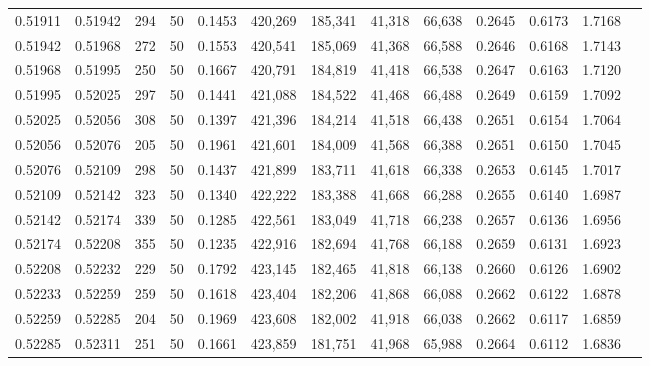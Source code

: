 \begin{tabular}{rrrrrrrrrrrrr}
0.51911 & 0.51942 &   294 &  50 &                                     0.1453 & 420,269 & 185,341 &  41,318 &  66,638 & 0.2645 & 0.6173 & 1.7168 \\
0.51942 & 0.51968 &   272 &  50 &                                     0.1553 & 420,541 & 185,069 &  41,368 &  66,588 & 0.2646 & 0.6168 & 1.7143 \\
0.51968 & 0.51995 &   250 &  50 &                                     0.1667 & 420,791 & 184,819 &  41,418 &  66,538 & 0.2647 & 0.6163 & 1.7120 \\
0.51995 & 0.52025 &   297 &  50 &                                     0.1441 & 421,088 & 184,522 &  41,468 &  66,488 & 0.2649 & 0.6159 & 1.7092 \\
0.52025 & 0.52056 &   308 &  50 &                                     0.1397 & 421,396 & 184,214 &  41,518 &  66,438 & 0.2651 & 0.6154 & 1.7064 \\
0.52056 & 0.52076 &   205 &  50 &                                     0.1961 & 421,601 & 184,009 &  41,568 &  66,388 & 0.2651 & 0.6150 & 1.7045 \\
0.52076 & 0.52109 &   298 &  50 &                                     0.1437 & 421,899 & 183,711 &  41,618 &  66,338 & 0.2653 & 0.6145 & 1.7017 \\
0.52109 & 0.52142 &   323 &  50 &                                     0.1340 & 422,222 & 183,388 &  41,668 &  66,288 & 0.2655 & 0.6140 & 1.6987 \\
0.52142 & 0.52174 &   339 &  50 &                                     0.1285 & 422,561 & 183,049 &  41,718 &  66,238 & 0.2657 & 0.6136 & 1.6956 \\
0.52174 & 0.52208 &   355 &  50 &                                     0.1235 & 422,916 & 182,694 &  41,768 &  66,188 & 0.2659 & 0.6131 & 1.6923 \\
0.52208 & 0.52232 &   229 &  50 &                                     0.1792 & 423,145 & 182,465 &  41,818 &  66,138 & 0.2660 & 0.6126 & 1.6902 \\
0.52233 & 0.52259 &   259 &  50 &                                     0.1618 & 423,404 & 182,206 &  41,868 &  66,088 & 0.2662 & 0.6122 & 1.6878 \\
0.52259 & 0.52285 &   204 &  50 &                                     0.1969 & 423,608 & 182,002 &  41,918 &  66,038 & 0.2662 & 0.6117 & 1.6859 \\
0.52285 & 0.52311 &   251 &  50 &                                     0.1661 & 423,859 & 181,751 &  41,968 &  65,988 & 0.2664 & 0.6112 & 1.6836 \\

\end{tabular}
